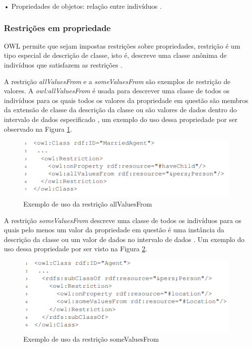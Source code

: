 \documentclass{bcc}
\begin{document}
• Propriedades de objetos: relação entre indivíduos \cite{welty2004}.

\subsubsection{Restrições em propriedade}

OWL permite que sejam impostas restrições sobre propriedades, restrição é um tipo especial de descrição de classe, isto é, descreve uma classe anônima de indivíduos que satisfazem as restrições \cite{de2005}.

A restrição \textit{allValuesFrom} e a \textit{someValuesFrom} são exemplos de restrição de valores. A \textit{owl:allValuesFrom} é usada para descrever uma classe de todos os indivíduos para os quais todos os valores da propriedade em questão são membros da extensão de classe da descrição da classe ou são valores de dados dentro do intervalo de dados especificado \cite{welty2004}, um exemplo do uso dessa propriedade por ser observado na Figura \ref{fig:allvalues}.

\begin{figure}[H]
\centering
\includegraphics[width=.9\textwidth]{Figuras/all_values.PNG}
\caption{Exemplo de uso da restrição allValuesFrom}
\label{fig:allvalues}
\end{figure}

A restrição \textit{someValuesFrom} descreve uma classe de todos os indivíduos para os quais pelo menos um valor da propriedade em questão é uma instância da descrição da classe ou um valor de dados no intervalo de dados \cite{welty2004}. Um exemplo do uso dessa propriedade por ser visto na Figura \ref{fig:somevalues}.

\begin{figure}[H]
\centering
\includegraphics[width=.9\textwidth]{Figuras/some_values.PNG}
\caption{Exemplo de uso da restrição someValuesFrom}
\label{fig:somevalues}
\end{figure}
\end{document}
